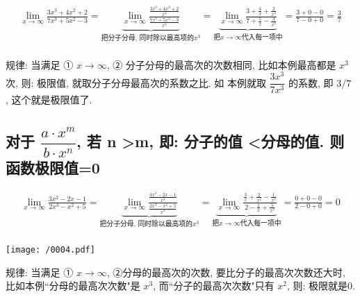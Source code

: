 \documentclass[UTF8]{ctexart}
\begin{document}
\begin{tcolorbox}[title = {例},boxrule={0.1em},colframe={black!10}, colback={black!3},colbacktitle={black!10},coltitle={black}]
	\begin{align*}  %
			\lim_{x\rightarrow \infty}\frac{3x^3+4x^2+2}{7x^3+5x^2-3}=\underset{\text{把分子分母,\ 同时除以最高项的}x^3}{\underbrace{\lim_{x\rightarrow \infty}\frac{\frac{3x^3+4x^2+2}{x^3}}{\frac{7x^3+5x^2-3}{x^3}}}}=\underset{\text{把}x\rightarrow \infty \text{代入每一项中}}{\underbrace{\lim_{x\rightarrow \infty}\frac{3+\frac{4}{x}+\frac{2}{x^3}}{7+\frac{5}{x}-\frac{3}{x^3}}}}=\frac{3+0-0}{7-0+0}=\frac{3}{7}\\
		\end{align*}
	
	规律: 当满足 ①  $x \rightarrow \infty$, ② 分子分母的最高次的次数相同, 比如本例最高都是 $x^3$ 次, 则: 极限值, 就取分子分母最高次的系数之比. 如 本例就取 $\dfrac{3 x^3} {7 x^3}$ 的系数, 即 $3/7$ , 这个就是极限值了.
\end{tcolorbox}




\subsection{对于 $ \dfrac{a \cdot x^m}{b \cdot x^n} $, 若 n \textgreater m, 即: 分子的值 \textless 分母的值. 则函数极限值=0}

\begin{tcolorbox}[title = {例},boxrule={0.1em},colframe={black!10}, colback={black!3},colbacktitle={black!10},coltitle={black}]
	\begin{align*}  %
			\lim_{x\rightarrow \infty}\frac{3x^2-2x-1}{2x^3-x^2+5}=\underset{\text{把分子分母,\ 同时除以最高项的}x^3}{\underbrace{\lim_{x\rightarrow \infty}\frac{\frac{3x^2-2x-1}{x^3}}{\frac{2x^3-x^2+5}{x^3}}}}=\underset{\text{把}x\rightarrow \infty \text{代入每一项中}}{\underbrace{\lim_{x\rightarrow \infty}\frac{\frac{3}{x}+\frac{2}{x^2}-\frac{1}{x^3}}{2-\frac{1}{x}+\frac{5}{x^3}}}}=\frac{0+0-0}{2-0+0}=0\\
	\end{align*}

	\texttt{[image: /0004.pdf]}
	
	规律: 当满足 ① $x \rightarrow \infty$, ②分母的最高次的次数, 要比分子的最高次次数还大时, 比如本例``分母的最高次次数"是 $x^3$, 而``分子的最高次次数"只有 $x^2$, 则: 极限就是0.
\end{tcolorbox}
\end{document}
